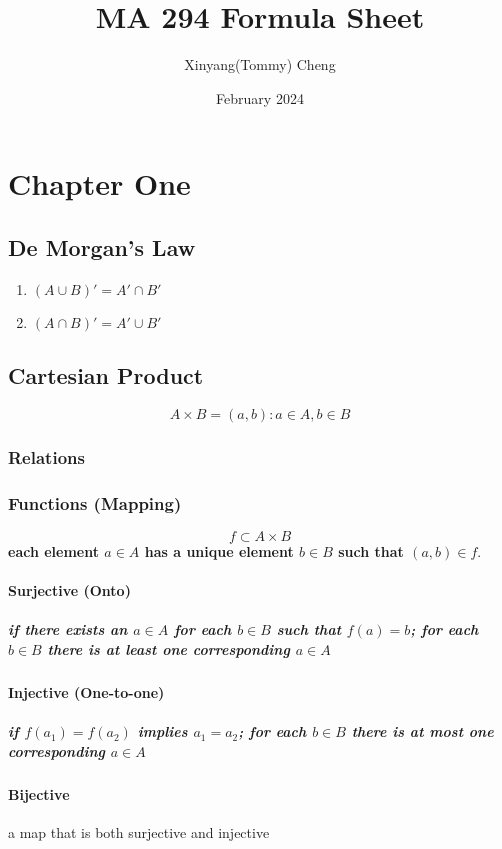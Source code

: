 \documentclass{article}
\title{MA 294 Formula Sheet}
\author{Xinyang(Tommy) Cheng}
\date{February 2024}
\begin{document}
\maketitle

\section{Chapter One}
\subsection{De Morgan's Law}
\begin{enumerate}
\item $(A \cup B)'=A' \cap B'$
\item $(A \cap B)'=A' \cup B'$
\end{enumerate}
\subsection{Cartesian Product}
$$A \times B = {(a,b): a\in A, b\in B}$$

\subsubsection{Relations}

\subsubsection{Functions (Mapping)}
$$f\subset A \times B$$
 \textbf{each element $a\in A$ has a unique element $b\in B$ such that $(a,b)\in f$}.
\paragraph{Surjective (Onto)}
\subparagraph{if there exists an $a\in A$ for each $b\in B$ such that $f(a)=b$; for each $b\in B$ there is at least one corresponding $a\in A$}
\paragraph{Injective (One-to-one)}
\subparagraph{if $f(a_1)=f(a_2)$ implies $a_1=a_2$; for each $b\in B$ there is at most one corresponding $a\in A$}
\paragraph{Bijective} a map that is both surjective and injective
\end{document}
